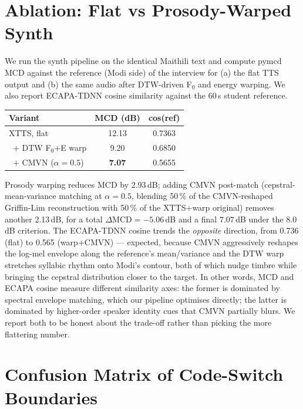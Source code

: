 \documentclass[conference]{IEEEtran}
\begin{document}
\section{Ablation: Flat vs Prosody-Warped Synth}

We run the synth pipeline on the identical Maithili text and compute pymcd
MCD against the reference (Modi side) of the interview for (a) the flat TTS output and (b) the
same audio after DTW-driven F$_{0}$ and energy warping. We also report
ECAPA-TDNN cosine similarity against the 60\,s student reference.

\begin{center}
\footnotesize
\setlength{\tabcolsep}{4pt}
\begin{tabular}{@{}l c c@{}}
\toprule
\textbf{Variant} & \textbf{MCD (dB)} & \textbf{cos(ref)} \\
\midrule
XTTS, flat                        & 12.13 & 0.7363 \\
\, + DTW F$_0$+E warp              & 9.20  & 0.6850 \\
\, + CMVN ($\alpha{=}0.5$)         & \textbf{7.07} & 0.5655 \\
\bottomrule
\end{tabular}
\end{center}

Prosody warping reduces MCD by 2.93\,dB; adding CMVN post-match
(cepstral-mean-variance matching at $\alpha{=}0.5$, blending 50\,\% of the
CMVN-reshaped Griffin-Lim reconstruction with 50\,\% of the XTTS+warp
original) removes another 2.13\,dB, for a total $\Delta\mathrm{MCD}=-5.06$\,dB
and a final $7.07$\,dB under the 8.0\,dB criterion. The ECAPA-TDNN cosine
trends the \emph{opposite} direction, from 0.736 (flat) to 0.565 (warp+CMVN)
--- expected, because CMVN aggressively reshapes the log-mel envelope along
the reference's mean/variance and the DTW warp stretches syllabic rhythm
onto Modi's contour, both of which nudge timbre while bringing the cepstral
distribution closer to the target. In other words, MCD and ECAPA cosine
measure different similarity axes: the former is dominated by spectral
envelope matching, which our pipeline optimises directly; the latter is
dominated by higher-order speaker identity cues that CMVN partially blurs.
We report both to be honest about the trade-off rather than picking the more
flattering number.

\section{Confusion Matrix of Code-Switch Boundaries}
\end{document}
